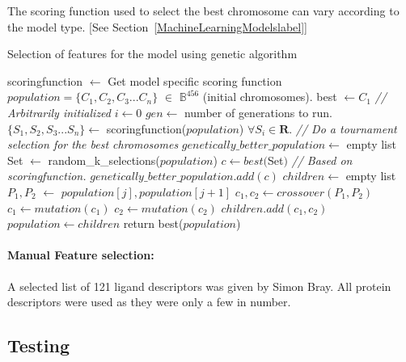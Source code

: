 \documentclass[11pt]{article}
\begin{document}
The scoring function used to select the best chromosome can vary according to the model type. [See Section~\ref{MachineLearningModelslabel}]

\begin{algorithm}
\caption{Selection of features for the model using genetic algorithm \cite{genetic_algorithm}}
\label{alg:GeneticAlgo}
\begin{algorithmic}[1]
\State scoringfunction $\gets$ Get model specific scoring function
\State $ population = \{C_1, C_2, C_3... C_n\}$ $\in$ $\mathbb{B}^{456}$ (initial chromosomes).
\State best $\gets C_1$  \textit{// Arbitrarily initialized}
\State $i \gets 0$
\State $gen \gets$ number of generations to run.
          \State $\{S_1, S_2, S_3... S_n\} \gets$ scoringfunction($population$) $\forall S_i \in \mathbf{R}$.
          \State \textit{// Do a tournament selection for the best chromosomes}
          \State $genetically\_better\_population \gets$ empty list
              \State Set $\gets$ random\_k\_selections($population$)
              \State $c \gets best($Set$)$ \textit{// Based on scoringfunction.}
              \State $genetically\_better\_population.add(c)$
          \EndFor
          \State $children \gets$ empty list
              \State $P_1, P_2$ $\gets$ $population[j], population[j+1]$
              \State $c_1, c_2 \gets crossover(P_1, P_2)$
              \State $c_1 \gets mutation(c_1)$
              \State $c_2 \gets mutation(c_2)$
              \State $children.add(c_1, c_2)$
          \EndFor
          \State $population \gets children$
      \EndFor
\State return best($population$)
\EndProcedure
\end{algorithmic}
\end{algorithm}

\paragraph{Manual Feature selection:}
A selected list of 121 ligand descriptors was given by Simon Bray. 
All protein descriptors were used as they were only a few in number.

\subsection{Testing}
\end{document}
